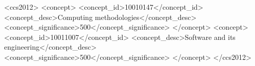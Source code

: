 \documentclass[sigconf,anonymous,review]{acmart}
\newcommand{\somesh}[1]{\textcolor{red}{[\textbf{Somesh}:#1]}}
\newcommand{\arnav}[1]{\textcolor{blue}{[#1]}}
\newcommand{\ayush}[1]{\textcolor{orange}{[\textbf{Ayush}:#1]}}
\newcommand{\manaswi}[1]{\textcolor{violet}{[\textbf{Manaswi}:#1]}}
\begin{document}
\begin{abstract}



\end{abstract}

\begin{CCSXML}
<ccs2012>
   <concept>
       <concept_id>10010147</concept_id>
       <concept_desc>Computing methodologies</concept_desc>
       <concept_significance>500</concept_significance>
       </concept>
   <concept>
       <concept_id>10011007</concept_id>
       <concept_desc>Software and its engineering</concept_desc>
       <concept_significance>500</concept_significance>
       </concept>
 </ccs2012>
\end{CCSXML}

\end{document}

